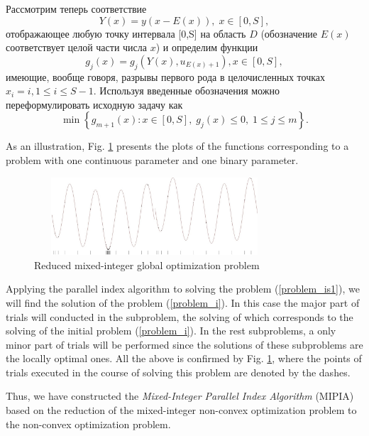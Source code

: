 \documentclass{llncs}
\begin{document}
Рассмотрим теперь соответствие 
\[
Y(x)=y(x-E(x)), \; x\in[0,S],
\]
отображающее любую точку интервала [0,S] на область $D$ (обозначение $E(x)$ соответствует целой части числа $x$) и определим функции 
\[
g_j(x) = g_j(Y(x),u_{E(x)+1}), x\in[0,S],
\]
имеющие, вообще говоря, разрывы первого рода в целочисленных точках $x_i = i, 1\leq i \leq S-1$.
Используя введенные обозначения можно переформулировать исходную задачу как
\begin{equation}\label{problem_is1}
\min \left\{g_{m+1}(x): x \in [0,S], \; g_j(x) \leq 0, \; 1 \leq j \leq m\right\}.
\end{equation}




As an illustration, Fig. \ref{fig:1} presents the plots of the functions corresponding to a 
problem with one continuous parameter and one binary parameter.

\begin{figure}[ht]
    \centering
    \includegraphics[height=2.9cm,width=0.8\textwidth]{fig1.jpg}
    \caption{Reduced mixed-integer global optimization problem}
    \label{fig:1}
\end{figure}

Applying the parallel index algorithm to solving the problem (\ref{problem_is1}), we will find 
the solution of the problem (\ref{problem_i}). In this case the major part of trials will conducted in 
the subproblem, the solving of which corresponds to the solving of the initial 
problem (\ref{problem_i}). In the rest subproblems, a only minor part of trials will be performed 
since the solutions of these subproblems are the locally optimal ones.
All the above is confirmed by Fig. \ref{fig:1}, where the  
points of trials executed in the course of solving this problem are denoted by the dashes.


Thus, we have constructed the \textit{Mixed-Integer Parallel Index Algorithm} (MIPIA) based on the  
reduction of the mixed-integer non-convex optimization problem to the non-convex optimization problem. 
\end{document}

